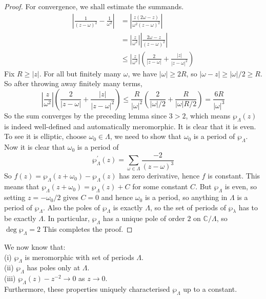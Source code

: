 \begin{proof}
    For convergence, we shall estimate the summands.
    \begin{align*}
        \left|\frac{1}{(z-\omega)^2}-\frac{1}{\omega^2} \right|&=\left|\frac{z(2\omega-z)}{\omega^2(z-\omega)^2} \right|\\
        &=\left|\frac{z}{\omega^2}\right|\left|\frac{2\omega-z}{(z-\omega)^2}\right|\\
        &\le \left|\frac{z}{\omega^2}\right|\left( \frac{2}{|z-\omega|}+\frac{|z|}{|z-\omega|^2} \right)
    \end{align*}
    Fix $R\ge|z|$.
    For all but finitely many $\omega$, we have $|\omega|\ge 2R$, so $|\omega-z|\ge |\omega|/2\ge R$.
    So after throwing away finitely many terms,
    $$\left|\frac{z}{\omega^2}\right|\left( \frac{2}{|z-\omega|}+\frac{|z|}{|z-\omega|^2} \right)\le\frac{R}{|\omega|^2}\left( \frac{2}{|\omega|/2}+\frac{R}{|\omega|R/2} \right)=\frac{6R}{|\omega|^3}$$
    So the sum converges by the preceding lemma since $3>2$, which means $\wp_\Lambda(z)$ is indeed well-defined and automatically meromorphic.
    It is clear that it is even.
    To see it is elliptic, choose $\omega_0\in\Lambda$, we need to show that $\omega_0$ is a period of $\wp_\Lambda$.
    Now it is clear that $\omega_0$ is a period of
    $$\wp_\Lambda^\prime(z)=\sum_{\omega\in\Lambda}\frac{-2}{(z-\omega)^3}$$
    So $f(z)=\wp_\Lambda(z+\omega_0)-\wp_\Lambda(z)$ has zero derivative, hence $f$ is constant.
    This means that $\wp_\Lambda(z+\omega_0)=\wp_\Lambda(z)+C$ for some constant $C$.
    But $\wp_\Lambda$ is even, so setting $z=-\omega_0/2$ gives $C=0$ and hence $\omega_0$ is a period, so anything in $\Lambda$ is a period of $\wp_\Lambda$.
    Also the poles of $\wp_\Lambda$ is exactly $\Lambda$, so the set of periods of $\wp_\lambda$ has to be exactly $\Lambda$.
    In particular, $\wp_\Lambda$ has a unique pole of order $2$ on $\mathbb C/\Lambda$, so $\deg\wp_\Lambda=2$
    This completes the proof.
\end{proof}
\begin{remark}
    We now know that:\\
    (i) $\wp_\Lambda$ is meromorphic with set of periods $\Lambda$.\\
    (ii) $\wp_\Lambda$ has poles only at $\Lambda$.\\
    (iii) $\wp_\Lambda(z)-z^{-2}\to 0$ as $z\to 0$.\\
    Furthermore, these properties uniquely characterised $\wp_\Lambda$ up to a constant.
\end{remark}